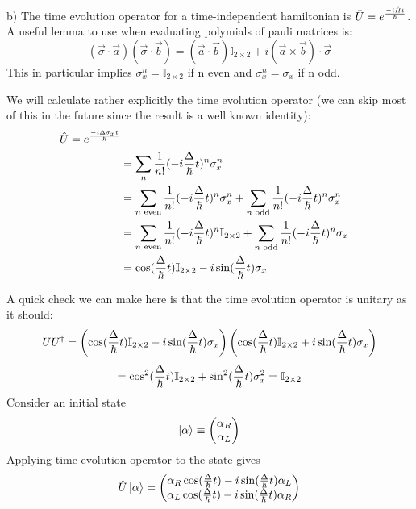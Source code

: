 \documentclass[10pt]{scrartcl}
\begin{document}
b)  The time evolution operator for a time-independent hamiltonian is $ \hat{U} = e^{- i  \hat{H} t \over \hbar}$.  A useful lemma to use when evaluating polymials of pauli matrices is:
\[ \left(\vec{\sigma} \cdot \vec{a} \right) \left( \vec{\sigma} \cdot \vec{b} \right) = (\vec{a} \cdot \vec{b}) \mathbb{I}_{2 \times 2} + i (\vec{a} \times \vec{b}) \cdot \vec{\sigma}  \]
This in particular implies $\sigma_x^{n} = \mathbb{I}_{2 \times 2}$  if n even and  $\sigma_x^{n} = \sigma_x$ if n odd.

We will calculate rather explicitly the time evolution operator (we can skip most of this in the future since the result is a well known identity):
\begin{align}
	\hat{U} = e^{-i \Delta \sigma_x t \over \hbar} \\
	& = \sum_n {1 \over n!} (- i {\Delta \over \hbar} t)^n \sigma_x^n \\
	& = \sum_{n \text{  even}} {1 \over n!} (- i {\Delta \over \hbar} t)^n \sigma_x^n + 
	\sum_{n \text{  odd}} {1 \over n!} (- i {\Delta \over \hbar} t)^n \sigma_x^n \\
	& = \sum_{n \text{  even}} {1 \over n!} (- i {\Delta \over \hbar} t)^n \mathbb{I}_{2 \times 2} + \sum_{n \text{  odd}} {1 \over n!} (- i {\Delta \over \hbar} t)^n \sigma_x \\
	& = \cos({\Delta  \over \hbar}t) \mathbb{I}_{2 \times 2} - i \sin({\Delta \over \hbar} t) \sigma_x
	\end{align}

A quick check we can make here is that the time evolution operator is unitary as it should:
\[ U U^\dagger = \left(\cos({\Delta  \over \hbar}t) \mathbb{I}_{2 \times 2} - i \sin({\Delta \over \hbar} t) \sigma_x \right)  \left(\cos({\Delta  \over \hbar}t) \mathbb{I}_{2 \times 2} + i \sin({\Delta \over \hbar} t) \sigma_x \right)\]
\[= \cos^2({\Delta  \over \hbar}t) \mathbb{I}_{2 \times 2}  + \sin^2({\Delta \over \hbar} t) \sigma_x^2 = \mathbb{I}_{2 \times 2}\]
Consider an initial state 
\[\ket{\alpha} \equiv \begin{pmatrix}
	\alpha_R \\
	\alpha_L
\end{pmatrix} \]
Applying time evolution operator to the state gives
\begin{align}
	\hat{U}\ket{\alpha} = 
	 \begin{pmatrix}
		\alpha_R \cos({\Delta \over \hbar}t) - i \sin({\Delta \over \hbar} t) \alpha_L\\
		\alpha_L \cos({\Delta \over \hbar} t)  - i \sin({\Delta \over \hbar} t) \alpha_R
	\end{pmatrix} 
\end{align}
\end{document}
